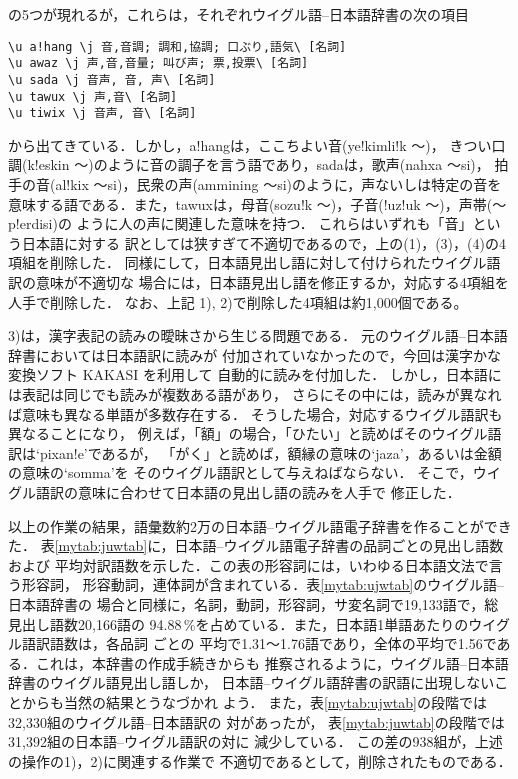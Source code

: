 {\noindent
の5つが現れるが，これらは，それぞれウイグル語--日本語辞書の次の項目
\begin{verbatim}
\u a!hang \j 音,音調; 調和,協調; 口ぶり,語気\ [名詞]
\u awaz \j 声,音,音量; 叫び声; 票,投票\ [名詞]
\u sada \j 音声, 音, 声\ [名詞]
\u tawux \j 声,音\ [名詞]
\u tiwix \j 音声, 音\ [名詞]
\end{verbatim}
\noindent
から出てきている．しかし，a!hangは，ここちよい音(ye!kimli!k 〜)，
きつい口調(k!eskin 〜)のように音の調子を言う語であり，sadaは，歌声(nahxa  〜si)，
拍手の音(al!kix 〜si)，民衆の声(ammining 〜si)のように，声ないしは特定の音を
意味する語である．また，tawuxは，母音(sozu!k 〜)，子音(!uz!uk  〜)，声帯(〜 p!erdisi)の
ように人の声に関連した意味を持つ． これらはいずれも「音」という日本語に対する
訳としては狭すぎて不適切であるので，上の(1)，(3)，(4)の4項組を削除した．
同様にして，日本語見出し語に対して付けられたウイグル語訳の意味が不適切な
場合には，日本語見出し語を修正するか，対応する4項組を人手で削除した．
なお、上記 1), 2)で削除した4項組は約1,000個である。

3)は，漢字表記の読みの曖昧さから生じる問題である．
元のウイグル語--日本語辞書においては日本語訳に読みが
付加されていなかったので，今回は漢字かな変換ソフト
KAKASI
を利用して
自動的に読みを付加した．
しかし，日本語には表記は同じでも読みが複数ある語があり，
さらにその中には，読みが異なれば意味も異なる単語が多数存在する．
そうした場合，対応するウイグル語訳も異なることになり，
例えば，「額」の場合，「ひたい」と読めばそのウイグル語訳は`pixan!e'であるが，
「がく」と読めば，額縁の意味の`jaza'，あるいは金額の意味の`somma'を
そのウイグル語訳として与えねばならない．
そこで，ウイグル語訳の意味に合わせて日本語の見出し語の読みを人手で
修正した．


以上の作業の結果，語彙数約2万の日本語--ウイグル語電子辞書を作ることができた．
\mbox{表\ref{mytab:juwtab}}に，日本語--ウイグル語電子辞書の品詞ごとの見出し語数
および
平均対訳語数を示した．この表の形容詞には，いわゆる日本語文法で言う形容詞，
形容動詞，連体詞が含まれている．表\ref{mytab:ujwtab}のウイグル語--日本語辞書の
場合と同様に，名詞，動詞，形容詞，サ変名詞で19,133語で，総見出し語数20,166語の
94.88\,\%を占めている．また，日本語1単語あたりのウイグル語訳語数は，各品詞
ごとの
平均で1.31〜1.76語であり，全体の平均で1.56である．これは，本辞書の作成手続きからも
推察されるように，ウイグル語--日本語辞書のウイグル語見出し語しか，
日本語--ウイグル語辞書の訳語に出現しないことからも当然の結果とうなづかれ
よう．
また，表\ref{mytab:ujwtab}の段階では32,330組のウイグル語--日本語訳の
対があったが，
表\ref{mytab:juwtab}の段階では31,392組の日本語--ウイグル語訳の対に
減少している．
この差の938組が，上述の操作の1)，2)に関連する作業で
不適切であるとして，削除されたものである．


}

